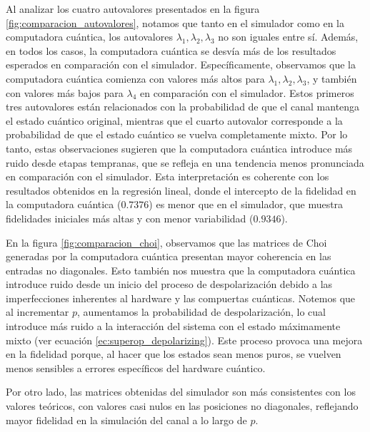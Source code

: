 \documentclass[letterpaper,12pt]{thesisECFM}
\theoremstyle{plain}
\theoremstyle{definition}
\theoremstyle{definition}
\theoremstyle{remark}
\newcommand{\1}{\mathbb{1}}
\begin{document}
Al analizar los cuatro autovalores presentados en la figura
\ref{fig:comparacion_autovalores}, notamos que tanto en el simulador como en la
computadora cuántica, los autovalores $\lambda_1,\lambda_2,\lambda_3$ no son
iguales entre sí. Además, en todos los casos, la computadora cuántica se desvía
más de los resultados esperados en comparación con el simulador.
Específicamente, observamos que la computadora cuántica comienza con valores
más altos para $\lambda_1,\lambda_2,\lambda_3$, y también con valores más bajos
para $\lambda_4$ en comparación con el simulador.  Estos primeros tres
autovalores están relacionados con la probabilidad de que el canal mantenga el
estado cuántico original, mientras que el cuarto autovalor corresponde a la
probabilidad de que el estado cuántico se vuelva completamente mixto. Por lo
tanto, estas observaciones sugieren que la computadora cuántica introduce más
ruido desde etapas tempranas, que se refleja en una tendencia menos pronunciada
en comparación con el simulador. Esta interpretación es coherente con los
resultados obtenidos en la regresión lineal, donde el intercepto de la
fidelidad en la computadora cuántica ($0.7376$) es menor que en el simulador,
que muestra fidelidades iniciales más altas y con menor variabilidad
($0.9346$).

En la figura \ref{fig:comparacion_choi}, observamos que las
matrices de Choi generadas por la computadora cuántica presentan mayor
coherencia en las entradas no diagonales. Esto también nos muestra que la
computadora cuántica introduce ruido desde un inicio del proceso de
despolarización debido a las imperfecciones inherentes al hardware y las
compuertas cuánticas. Notemos que al incrementar $p$, aumentamos la probabilidad de
despolarización, lo cual introduce más ruido a la interacción del sistema con
el estado máximamente mixto (ver ecuación
\ref{ec:superop_depolarizing}). Este proceso provoca una mejora en la
fidelidad porque, al hacer que los estados sean menos puros, se vuelven menos
sensibles a errores específicos del hardware cuántico. 

Por otro lado, las matrices obtenidas del simulador son
más consistentes con los valores teóricos, con valores casi nulos en las
posiciones no diagonales, reflejando mayor fidelidad en la simulación del canal
a lo largo de $p$.
\end{document}

